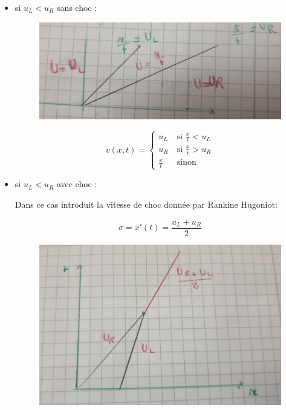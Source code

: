 \begin{itemize}

\item si $u_L<u_R$  sans choc : 

\begin{figure}[h!]
	\centering \includegraphics[scale=0.3]{Images_Fichiers/Y7.png}
\end{figure}

\begin{equation}
\label{systeme}
 v(x,t) =
\left \lbrace \begin{array}{rl}
u_L & ~\text{si }  \frac{x}{t} < u_L\\
u_R & ~\text{si }  \frac{x}{t} > u_R\\
\frac{x}{t} & ~\text{sinon} 
\end{array}\right.
\end{equation}

\item si $u_L<u_R$  avec choc : 

Dans ce cas introduit la vitesse de choc donn\'ee par Rankine Hugoniot:

$$\sigma = x'(t) = \frac{u_L + u_R}{2}$$

\begin{figure}[h!]
	\centering \includegraphics[scale=0.3]{Images_Fichiers/Y8.png}
\end{figure}



\end{itemize}
